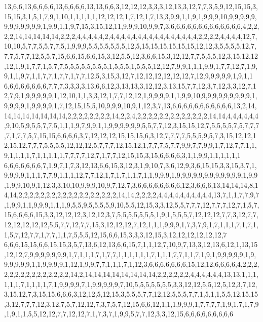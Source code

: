 13,6,6,13,6,6,6,6,13,6,6,6,6,13,13,6,6,3,12,12,12,3,3,3,12,13,3,12,7,7,3,5,9,12,15,15,3,15,15,3,1,5,1,7,9,1,10,1,1,1,1,1,12,12,12,1,7,12,1,7,13,3,9,9,1,1,9,1,9,9,9,10,9,9,9,9,9,9,9,9,9,9,9,9,1,9,9,1,1,9,7,15,3,15,12,11,9,9,9,10,9,9,7,3,6,6,6,6,6,6,6,6,6,6,6,6,6,4,2,2,2,2,14,14,14,14,14,2,2,2,4,4,4,4,4,2,4,4,4,4,4,4,4,4,4,4,4,4,4,4,4,4,2,2,2,2,4,4,4,4,12,7,10,10,5,7,7,5,5,7,7,5,1,9,9,9,5,5,5,5,5,5,5,12,5,15,15,15,15,15,15,12,12,3,5,5,5,5,12,7,7,7,5,7,7,12,5,5,7,15,6,6,15,6,6,15,3,12,5,5,12,3,6,6,15,3,12,12,7,7,5,5,5,12,3,15,12,12,12,1,9,1,7,7,1,5,7,7,5,5,5,5,5,5,5,5,1,5,5,5,1,5,5,5,12,12,7,9,9,1,1,1,9,9,1,7,7,12,7,1,9,9,1,1,9,7,1,1,7,7,1,7,7,1,7,7,12,5,3,15,3,12,7,12,12,12,12,12,12,7,12,9,9,9,9,9,1,9,1,1
6,6,6,6,6,6,6,6,7,7,7,3,3,3,3,13,6,6,12,3,13,13,3,12,12,3,13,15,7,7,12,3,7,12,3,3,12,7,12,7,9,1,9,9,9,9,9,1,12,10,1,1,3,3,12,1,7,7,12,12,1,9,9,9,9,1,1,9,9,10,9,9,9,9,9,9,9,9,9,1,9,9,9,9,1,9,9,9,9,1,7,12,15,15,5,10,9,9,9,10,9,1,12,3,7,13,6,6,6,6,6,6,6,6,6,6,6,13,2,14,14,14,14,14,14,14,14,2,2,2,2,2,2,2,2,14,2,2,4,2,2,2,2,2,2,2,2,2,2,2,2,2,14,14,4,4,4,4,4,4,9,10,5,9,5,5,7,7,5,1,1,1,9,7,9,9,1,1,9,9,9,9,9,9,5,5,7,7,12,3,15,15,12,7,5,5,5,5,7,5,7,7,7,7,1,7,7,5,7,15,15,6,6,6,6,3,7,12,12,12,15,15,15,6,3,12,7,7,7,7,5,5,5,9,5,7,3,15,12,12,12,15,12,7,7,7,5,5,5,5,12,12,12,5,7,7,7,12,15,12,1,7,7,7,5,7,7,9,9,7,7,9,9,1,7,12,7,7,1,1,9,1,1,1,1,7,1,1,1,1,1,7,7,7,7,12,7,1,7,7,12,15,15,3,15,6,6,6,6,3,1,1,9,9,1,1,1,1,1,1
6,6,6,6,6,6,6,7,1,9,7,1,7,3,12,13,6,6,15,3,12,3,1,9,10,7,3,6,12,9,3,6,15,15,3,3,15,3,7,1,9,9,9,9,1,1,1,7,7,9,1,1,1,12,7,7,12,1,7,1,7,1,1,7,1,1,9,9,9,1,9,9,9,9,9,9,9,9,9,9,9,9,1,9,9,1,9,9,10,9,1,12,3,3,10,10,9,9,9,10,9,7,12,7,3,6,6,6,6,6,6,6,6,12,3,6,6,6,13,14,14,14,8,14,14,2,2,2,2,2,2,2,2,2,2,2,2,2,2,2,2,2,2,14,14,2,2,2,2,4,4,4,4,4,4,4,4,4,4,13,7,1,1,7,7,9,7,1,9,9,1,1,9,9,9,1,1,1,9,5,5,9,5,5,5,5,9,10,5,5,12,15,3,3,12,5,5,7,7,7,12,7,7,7,12,7,1,5,7,15,6,6,6,6,15,3,3,12,12,12,3,12,12,3,7,5,5,5,5,5,5,5,1,9,1,5,5,5,7,12,12,12,7,7,3,12,7,7,12,12,12,12,12,5,5,7,7,12,7,7,15,3,12,12,12,7,12,1,1,1,9,9,9,1,7,3,7,9,1,7,1,1,1,7,1,7,1,1,5,7,12,7,7,1,7,7,1,1,7,5,5,5,12,15,6,6,15,3,3,3,12,15,3,12,12,12,12,12,12,7
6,6,6,15,15,6,6,15,15,3,5,7,13,6,12,13,6,6,15,7,1,1,12,7,10,9,7,13,3,12,13,6,12,1,13,15,12,12,7,9,9,9,9,9,9,9,1,7,1,1,1,7,1,7,7,1,1,1,1,1,1,7,1,1,1,7,7,1,1,7,1,9,1,9,9,9,9,9,1,9,9,9,9,9,9,1,1,9,9,9,9,1,12,1,9,9,7,7,1,1,1,7,1,12,3,6,6,6,6,6,6,6,15,12,12,6,6,6,6,4,2,2,2,2,2,2,2,2,2,2,2,2,2,2,2,14,2,14,14,14,14,14,14,14,14,2,2,2,2,2,2,4,4,4,4,4,4,13,13,1,1,1,1,1,1,7,1,1,1,1,7,1,9,9,9,9,7,1,9,9,9,9,9,7,10,5,5,5,5,5,5,5,3,3,12,12,5,5,12,5,12,3,7,12,3,15,12,7,3,15,15,6,6,6,3,12,12,5,12,15,3,5,5,5,7,7,12,12,5,5,5,7,7,1,5,1,1,5,5,12,15,15,3,12,7,7,7,12,3,12,7,5,7,12,12,7,3,7,5,7,12,15,6,6,12,1,1,1,9,9,9,1,7,7,7,7,1,9,1,7,1,7,9,1,9,1,1,5,5,12,12,7,7,12,12,7,1,7,3,7,1,9,9,5,7,7,12,3,3,12,15,6,6,6,6,6,6,6,6,6
